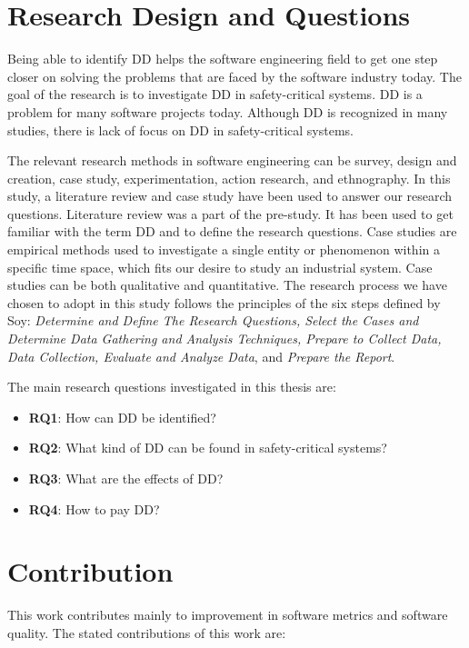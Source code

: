 \section{Research Design and Questions}
\label{sec:chap1designquesitons}
Being able to identify DD helps the software engineering field to get one step closer on solving the problems that are faced by the software industry today. The goal of the research is to investigate DD in safety-critical systems. DD is a problem for many software projects today. Although DD is recognized in many studies, there is lack of focus on DD in safety-critical systems. 

The relevant research methods in software engineering can be survey, design and creation, case study, experimentation, action research, and ethnography\cite{Oates:2006:RIS:1202299}. In this study, a literature review and case study have been used to answer our research questions. Literature review was a part of the pre-study. It has been used to get familiar with the term DD and to define the research questions. Case studies are empirical methods used to investigate a single entity or phenomenon within a specific time space\cite{Wohlin:2000:ESE:330775}, which fits our desire to study an industrial system. Case studies can be both qualitative and quantitative\cite{bassey2003case,Oates:2006:RIS:1202299}. The research process we have chosen to adopt in this study follows the principles of the six steps defined by Soy\cite{soysusan}: \textit{Determine and Define The Research Questions, Select the Cases and Determine Data Gathering and Analysis Techniques, Prepare to Collect Data, Data Collection, Evaluate and Analyze Data}, and \textit{Prepare the Report}.

The main research questions investigated in this thesis are:

\begin{itemize}
	\item \textbf{RQ1}: How can DD be identified?
	\item \textbf{RQ2}: What kind of DD can be found in safety-critical systems?
	\item \textbf{RQ3}: What are the effects of DD?
	\item \textbf{RQ4}: How to pay DD?
\end{itemize}

\section{Contribution}
This work contributes mainly to improvement in software metrics and software quality. The stated contributions of this work are:


